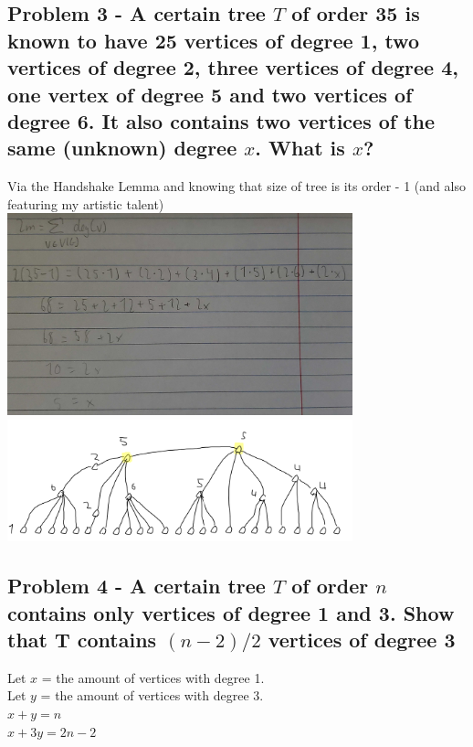 \documentclass[10pt,a4paper]{article}
\begin{document}
\subsection*{\newpage Problem 3 - A certain tree $T$ of order 35 is known to have 25 vertices of degree 1, two vertices of degree 2, three vertices of degree 4, one vertex of degree 5 and two vertices of degree 6. It also contains two vertices of the same (unknown) degree $x$. What is $x$? }

Via the Handshake Lemma and knowing that size of tree is its order - 1 (and also featuring my artistic talent)\\
\includegraphics[width = 10cm]{question3_calculation}\\
\includegraphics[width = 10cm]{question3_image}\\

\subsection*{Problem 4 - A certain tree $T$ of order $n$ contains only vertices of degree 1 and 3. Show that T contains $(n − 2)/2$ vertices of degree 3}

Let $x$ = the amount of vertices with degree 1.\\
Let $y$ = the amount of vertices with degree 3.\\
$x + y = n$\\
$x + 3y = 2n - 2$
\end{document}
